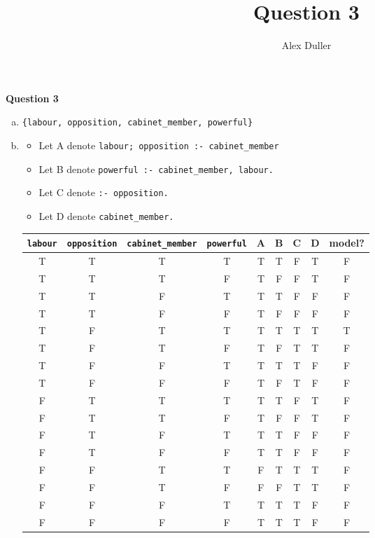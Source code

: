 \documentclass[a4paper,11pt]{article}
\author{Alex Duller}
\title{Question 3}
\begin{document}
\textbf{Question 3}
\begin{enumerate}[(a)]
\item \verb#{labour, opposition, cabinet_member, powerful}#
\item
\begin{itemize}
\item Let A denote \verb#labour; opposition :- cabinet_member#
\item Let B denote \verb#powerful :- cabinet_member, labour.#
\item Let C denote \verb#:- opposition.#
\item Let D denote \verb#cabinet_member.#
\end{itemize}
\begin{center}
\begin{tabular}{ | c | c | c | c || c | c | c | c | c | }
  \hline
  \verb#labour# & \verb|opposition| & \verb|cabinet_member| & \verb|powerful| & A & B & C & D & model?\\
  \hline
  \hline
  T & T & T & T &     T & T & F & T &    F \\
  \hline
  T & T & T & F &     T & F & F & T &    F \\
  \hline
  T & T & F & T &     T & T & F & F &    F \\
  \hline
  T & T & F & F &     T & F & F & F &    F \\
  \hline
  T & F & T & T &     T & T & T & T &    T \\
  \hline
  T & F & T & F &     T & F & T & T &    F \\
  \hline
  T & F & F & T &     T & T & T & F &    F \\
  \hline
  T & F & F & F &     T & F & T & F &    F \\
  \hline
  F & T & T & T &     T & T & F & T &    F \\
  \hline
  F & T & T & F &     T & F & F & T &    F \\
  \hline
  F & T & F & T &     T & T & F & F &    F \\
  \hline
  F & T & F & F &     T & T & F & F &    F \\
  \hline
  F & F & T & T &     F & T & T & T &    F \\
  \hline
  F & F & T & F &     F & F & T & T &    F \\
  \hline
  F & F & F & T &     T & T & T & F &    F \\
  \hline
  F & F & F & F &     T & T & T & F &    F \\
  \hline
\end{tabular}
\end{center}


\end{enumerate}
\end{document}

